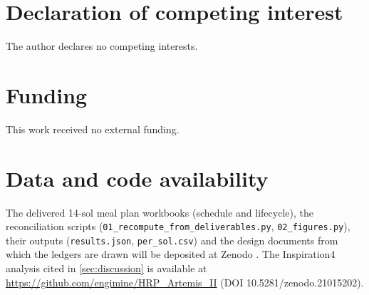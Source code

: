 \documentclass[11pt,a4paper,3p,authoryear]{elsarticle}
\begin{document}
\section*{Declaration of competing interest}
The author declares no competing interests.

\section*{Funding}
This work received no external funding.

\section*{Data and code availability}
The delivered 14-sol meal plan workbooks (schedule and lifecycle), the reconciliation scripts (\texttt{01\_recompute\_from\_deliverables.py}, \texttt{02\_figures.py}), their outputs (\texttt{results.json}, \texttt{per\_sol.csv}) and the design documents from which the ledgers are drawn will be deposited at Zenodo \citep{ZenodoEsperanza2026}. The Inspiration4 analysis cited in \cref{sec:discussion} is available at \url{https://github.com/engimine/HRP_Artemis_II} (DOI 10.5281/zenodo.21015202).


\end{document}
